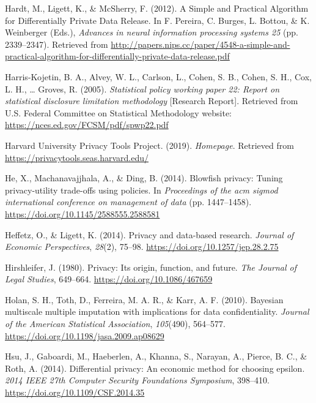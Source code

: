 \documentclass[]{article}
\begin{document}
\hypertarget{ref-Hardt:Simple:NIPS:2012}{}
Hardt, M., Ligett, K., \& McSherry, F. (2012). A Simple and Practical
Algorithm for Differentially Private Data Release. In F. Pereira, C.
Burges, L. Bottou, \& K. Weinberger (Eds.), \emph{Advances in neural
information processing systems 25} (pp. 2339--2347). Retrieved from
\url{http://papers.nips.cc/paper/4548-a-simple-and-practical-algorithm-for-differentially-private-data-release.pdf}

\hypertarget{ref-spwp22}{}
Harris-Kojetin, B. A., Alvey, W. L., Carlson, L., Cohen, S. B., Cohen,
S. H., Cox, L. H., \ldots{} Groves, R. (2005). \emph{Statistical policy
working paper 22: Report on statistical disclosure limitation
methodology} {[}Research Report{]}. Retrieved from U.S. Federal
Committee on Statistical Methodology website:
\url{https://nces.ed.gov/FCSM/pdf/spwp22.pdf}

\hypertarget{ref-Harvard:PrivacyTools}{}
Harvard University Privacy Tools Project. (2019). \emph{Homepage}.
Retrieved from \url{https://privacytools.seas.harvard.edu/}

\hypertarget{ref-He:Blowfish:ACMSIGMOD:2014}{}
He, X., Machanavajjhala, A., \& Ding, B. (2014). Blowfish privacy:
Tuning privacy-utility trade-offs using policies. In \emph{Proceedings
of the acm sigmod international conference on management of data} (pp.
1447--1458). \url{https://doi.org/10.1145/2588555.2588581}

\hypertarget{ref-Heffetz2014}{}
Heffetz, O., \& Ligett, K. (2014). Privacy and data-based research.
\emph{Journal of Economic Perspectives}, \emph{28}(2), 75--98.
\url{https://doi.org/10.1257/jep.28.2.75}

\hypertarget{ref-hirshleifer1980privacy}{}
Hirshleifer, J. (1980). Privacy: Its origin, function, and future.
\emph{The Journal of Legal Studies}, 649--664.
\url{https://doi.org/10.1086/467659}

\hypertarget{ref-Holan2010}{}
Holan, S. H., Toth, D., Ferreira, M. A. R., \& Karr, A. F. (2010).
Bayesian multiscale multiple imputation with implications for data
confidentiality. \emph{Journal of the American Statistical Association},
\emph{105}(490), 564--577.
\url{https://doi.org/10.1198/jasa.2009.ap08629}

\hypertarget{ref-Hsu:EconomicEpsilon:IEEE:2014}{}
Hsu, J., Gaboardi, M., Haeberlen, A., Khanna, S., Narayan, A., Pierce,
B. C., \& Roth, A. (2014). Differential privacy: An economic method for
choosing epsilon. \emph{2014 IEEE 27th Computer Security Foundations
Symposium}, 398--410. \url{https://doi.org/10.1109/CSF.2014.35}
\end{document}
